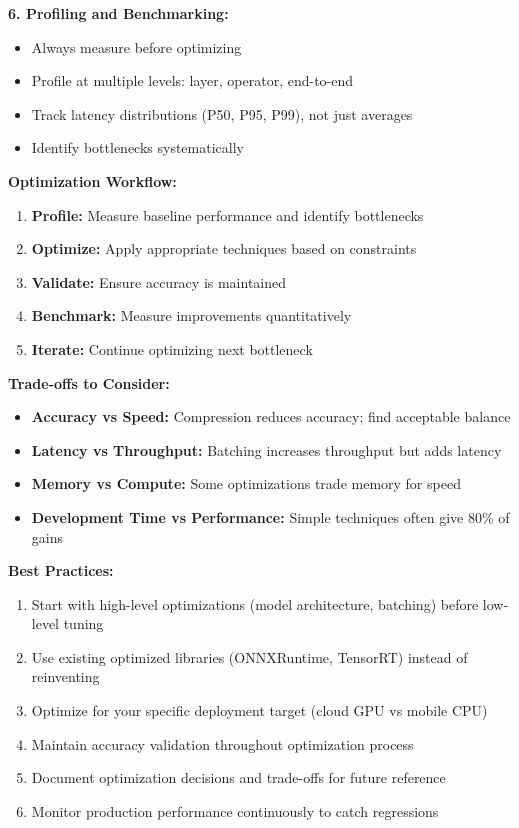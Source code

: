 \textbf{6. Profiling and Benchmarking:}
\begin{itemize}
    \item Always measure before optimizing
    \item Profile at multiple levels: layer, operator, end-to-end
    \item Track latency distributions (P50, P95, P99), not just averages
    \item Identify bottlenecks systematically
\end{itemize}

\textbf{Optimization Workflow:}

\begin{enumerate}
    \item \textbf{Profile:} Measure baseline performance and identify bottlenecks
    \item \textbf{Optimize:} Apply appropriate techniques based on constraints
    \item \textbf{Validate:} Ensure accuracy is maintained
    \item \textbf{Benchmark:} Measure improvements quantitatively
    \item \textbf{Iterate:} Continue optimizing next bottleneck
\end{enumerate}

\textbf{Trade-offs to Consider:}

\begin{itemize}
    \item \textbf{Accuracy vs Speed:} Compression reduces accuracy; find acceptable balance
    \item \textbf{Latency vs Throughput:} Batching increases throughput but adds latency
    \item \textbf{Memory vs Compute:} Some optimizations trade memory for speed
    \item \textbf{Development Time vs Performance:} Simple techniques often give 80\% of gains
\end{itemize}

\textbf{Best Practices:}

\begin{enumerate}
    \item Start with high-level optimizations (model architecture, batching) before low-level tuning
    \item Use existing optimized libraries (ONNXRuntime, TensorRT) instead of reinventing
    \item Optimize for your specific deployment target (cloud GPU vs mobile CPU)
    \item Maintain accuracy validation throughout optimization process
    \item Document optimization decisions and trade-offs for future reference
    \item Monitor production performance continuously to catch regressions
\end{enumerate}

